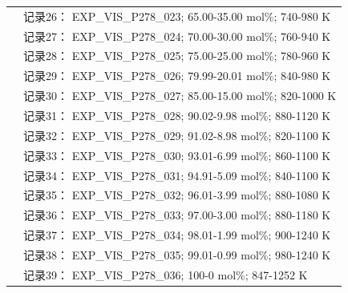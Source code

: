 \documentclass[12pt]{article}
\begin{document}
{\begin{longtable}[]{@{}
  >{\raggedright\arraybackslash}p{}
  >{\raggedright\arraybackslash}p{}@{}}
 & 记录26： EXP\_VIS\_P278\_023; 65.00-35.00 mol\%; 740-980 K \\
 & 记录27： EXP\_VIS\_P278\_024; 70.00-30.00 mol\%; 760-940 K \\
 & 记录28： EXP\_VIS\_P278\_025; 75.00-25.00 mol\%; 780-960 K \\
 & 记录29： EXP\_VIS\_P278\_026; 79.99-20.01 mol\%; 840-980 K \\
 & 记录30： EXP\_VIS\_P278\_027; 85.00-15.00 mol\%; 820-1000 K \\
 & 记录31： EXP\_VIS\_P278\_028; 90.02-9.98 mol\%; 880-1120 K \\
 & 记录32： EXP\_VIS\_P278\_029; 91.02-8.98 mol\%; 820-1100 K \\
 & 记录33： EXP\_VIS\_P278\_030; 93.01-6.99 mol\%; 860-1100 K \\
 & 记录34： EXP\_VIS\_P278\_031; 94.91-5.09 mol\%; 840-1100 K \\
 & 记录35： EXP\_VIS\_P278\_032; 96.01-3.99 mol\%; 880-1080 K \\
 & 记录36： EXP\_VIS\_P278\_033; 97.00-3.00 mol\%; 880-1180 K \\
 & 记录37： EXP\_VIS\_P278\_034; 98.01-1.99 mol\%; 900-1240 K \\
 & 记录38： EXP\_VIS\_P278\_035; 99.01-0.99 mol\%; 980-1240 K \\
 & 记录39： EXP\_VIS\_P278\_036; 100-0 mol\%; 847-1252 K  \\


\end{longtable}}
\end{document}
